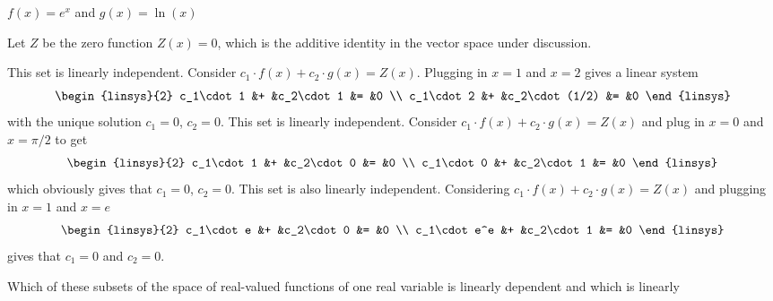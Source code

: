 \begin{exercises}
\begin{exparts}
      \partsitem \( f(x)=e^x \) and \( g(x)=\ln(x) \)
    \end{exparts}
    \begin{answer}
      Let $Z$ be the zero function $Z(x)=0$, which is the additive identity in
      the vector space under discussion.
      \begin{exparts}
        \partsitem This set is linearly independent.  
          Consider \( c_1\cdot f(x)+c_2\cdot g(x)=Z(x) \).
          Plugging in \( x=1 \) and \( x=2 \) gives a linear system 
          \begin{equation*}
            \begin{linsys}{2}
              c_1\cdot 1  &+  &c_2\cdot 1     &=  &0  \\
              c_1\cdot 2  &+  &c_2\cdot (1/2) &=  &0
            \end{linsys}
          \end{equation*}
          with the unique solution \( c_1=0 \), \( c_2=0 \).
        \partsitem This set is linearly independent.  
          Consider \( c_1\cdot f(x)+c_2\cdot g(x)=Z(x) \) and 
          plug in \( x=0 \) and \( x=\pi/2 \) to get 
          \begin{equation*}
            \begin{linsys}{2}
              c_1\cdot 1  &+  &c_2\cdot 0     &=  &0  \\
              c_1\cdot 0  &+  &c_2\cdot 1     &=  &0
            \end{linsys}
          \end{equation*}
          which obviously gives that \( c_1=0 \), \( c_2=0 \).
        \partsitem This set is also linearly independent.  
          Considering \( c_1\cdot f(x)+c_2\cdot g(x)=Z(x) \) and 
          plugging in \( x=1 \) and \( x=e \) 
          \begin{equation*}
            \begin{linsys}{2}
              c_1\cdot e    &+  &c_2\cdot 0     &=  &0  \\
              c_1\cdot e^e  &+  &c_2\cdot 1     &=  &0
            \end{linsys}
          \end{equation*}
          gives that \( c_1=0 \) and \( c_2=0 \).
      \end{exparts}  
     \end{answer}
  \recommended \item 
    Which of these subsets of the space of real-valued functions
    of one real variable is linearly dependent and which is linearly

\end{exercises}
